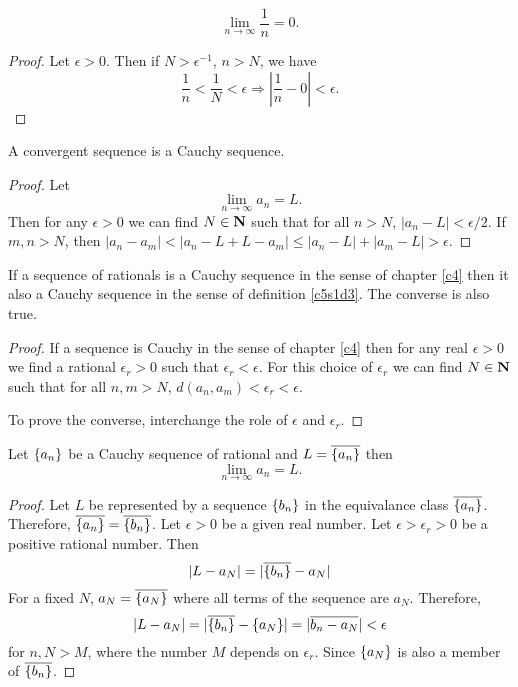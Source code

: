 \begin{prop}\label{c5s1p2}
\[
\lim_{n \rightarrow \infty} \frac{1}{n} = 0.
\]
\end{prop}
\begin{proof}
Let $\epsilon > 0$. Then if $N > \epsilon^{-1}$, $n > N$, we have 
\[
\frac{1}{n} < \frac{1}{N} < \epsilon \Rightarrow \left|\frac{1}{n} - 0\right|
< \epsilon.
\]
\end{proof}

\begin{prop}\label{c5s1p3}
A convergent sequence is a Cauchy sequence.
\end{prop}
\begin{proof}
Let 
\[
\lim_{n \rightarrow \infty} a_n = L.
\]
Then for any $\epsilon > 0$ we can find $N \in \mathbf{N}$ such that for all
$n > N$, $|a_n - L| < \epsilon/2$. If $m, n > N$, then $|a_n - a_m| <
|a_n - L + L - a_m| \le |a_n - L| + |a_m - L| > \epsilon$.
\end{proof}

\begin{prop}\label{c5s1p4}
If a sequence of rationals is a Cauchy sequence in the sense of chapter 
\ref{c4} then it also a Cauchy sequence in the sense of definition 
\ref{c5s1d3}. The converse is also true.
\end{prop}
\begin{proof}
If a sequence is Cauchy in the sense of chapter \ref{c4} then for any real
$\epsilon > 0$ we find a rational $\epsilon_r > 0$ such that $\epsilon_r <
\epsilon$. For this choice of $\epsilon_r$ we can find $N \in \mathbf{N}$ such that
for all $n, m > N$, $d(a_n, a_m) < \epsilon_r < \epsilon$.

To prove the converse, interchange the role of $\epsilon$ and $\epsilon_r$.
\end{proof}

\begin{prop}\label{c5s1p5}
Let $\{a_n\}$ be a Cauchy sequence of rational and $L = 
\overline{\{a_n\}}$ then 
\[
\lim_{n \rightarrow \infty} a_n = L.
\]
\end{prop}
\begin{proof}
Let $L$ be represented by a sequence $\{b_n\}$ in the equivalance class
$\overline{\{a_n\}}$. Therefore, $\overline{\{a_n\}} = 
\overline{\{b_n\}}$. Let $\epsilon > 0$ be a given real number. Let 
$\epsilon > \epsilon_r > 0$ be a positive rational number. Then
\[
|L - a_N| = |\overline{\{b_n\}} - a_N|
\]
For a fixed $N$, $a_N = \overline{\{a_N\}}$ where all terms of the sequence
are $a_N$. Therefore,
\[
|L - a_N| = |\overline{\{b_n\}} - \{a_N\}| = |\overline{b_n - a_N}| <
\epsilon
\]
for $n, N > M$, where the number $M$ depends on $\epsilon_r$. Since 
$\{a_N\}$ is also a member of $\overline{\{b_n\}}$.
\end{proof}


